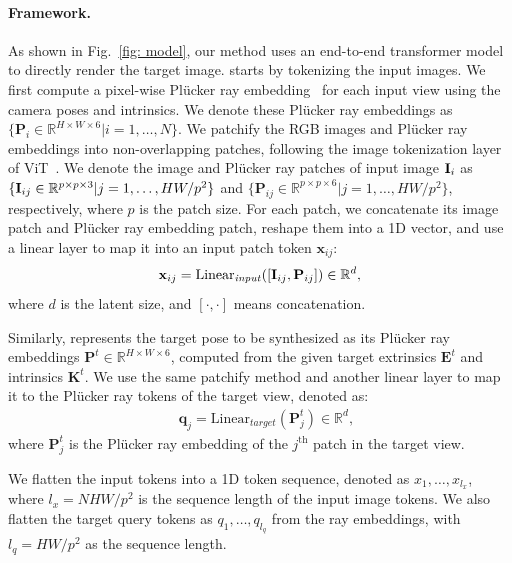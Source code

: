 \paragraph{Framework.} As shown in Fig.~\ref{fig: model}, our \paperName method uses an end-to-end transformer model to directly render the target image. 
\paperName starts by tokenizing the input images. We first compute a pixel-wise Pl\"ucker ray embedding~\citep{plucker1865xvii} for each input view using the camera poses and intrinsics. 
We denote these Pl\"ucker ray embeddings as $\{\mathbf{P}_i \in \mathbb{R}^ {H\times W \times 6} | i = 1,\ldots,N\}$. We patchify the RGB images and Pl\"ucker ray embeddings into non-overlapping patches, following the image tokenization layer of ViT~\citep{dosovitskiy2020image}. We denote the image and Pl\"ucker ray patches of input image $\mathbf{I}_i$ as $\{\mathbf{I}_{ij} \in \mathbb{R}^{p\times p\times 3} | j = 1,\ldots,HW/p^2\}$ and $\{\mathbf{P}_{ij} \in \mathbb{R}^{p\times p\times 6}| j = 1,\ldots, HW/p^2\}$, respectively, where $p$ is the patch size. 
For each patch, we concatenate its image patch and Pl\"ucker ray embedding patch, reshape them into a 1D vector, and use a linear layer to map it into an input patch token 
$\mathbf{x}_{ij}$: 
\begin{align}
    \mathbf{x}_{ij} = \text{Linear}_\mathit{input}([\mathbf{I}_{ij}, \mathbf{P}_{ij}]) \in \mathbb{R}^d,
\end{align}
where $d$ is the latent size, and $[\cdot, \cdot]$ means concatenation.

Similarly, \paperName{} represents the target pose to be synthesized as its Pl\"ucker ray embeddings $\mathbf{P}^t \in \mathbb{R}^ {H\times W \times 6}$, computed from the given target extrinsics $\mathbf{E}^t$ and intrinsics $\mathbf{K}^t$. We use the same patchify method and another linear layer to map it to the Pl\"ucker ray tokens of the target view, denoted as:
\begin{align}
    \quad \mathbf{q}_{j} = \text{Linear}_\mathit{target}(\mathbf{P}^{t}_{j}) \in \mathbb{R}^d,
\end{align}
where $\mathbf{P}^{t}_{j}$ is the Pl\"ucker ray embedding of the $j^\text{th}$ patch in the target view.

We flatten the input tokens into a 1D token sequence, denoted as  $x_1, \ldots, x_{\mathit{l}_x}$, where $\mathit{l}_x\!=\!NHW/p^2$ is the sequence length of the input image tokens. We also flatten the target query tokens as $q_1, \ldots, q_{\mathit{l}_q}$ from the ray embeddings, with $\mathit{l}_q=HW/p^2$ as the sequence length. 

